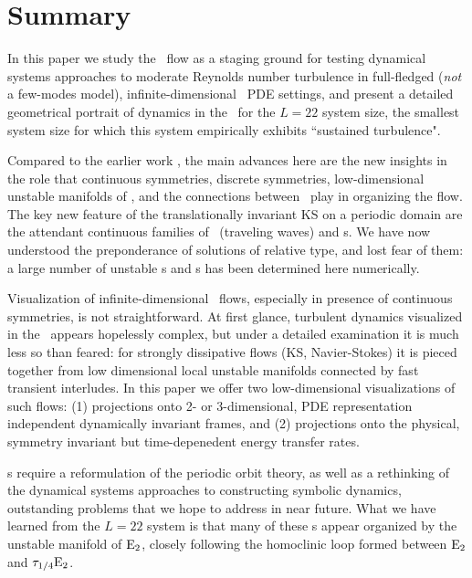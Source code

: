 
\section{Summary}
\label{sect:rpo-sum}

In this paper we study the \KS\ flow as a staging ground for
testing dynamical systems approaches to
moderate Reynolds number turbulence in full-fledged
({\em not} a few-modes model),
infinite-dimensional \statesp\ PDE settings,
and present a detailed geometrical portrait of dynamics in the
{\KS} \statesp\ for the $L=22$ system size, the smallest
system size for which this system empirically exhibits
``sustained turbulence".

Compared to the earlier work
,
the main advances here are the new insights in
the role that continuous symmetries,
discrete symmetries,
low-dimensional unstable manifolds of \eqva,
and the connections between \eqva\ play in organizing the flow.
The key new feature of the translationally invariant KS
on a periodic domain
are the attendant continuous families of
\reqva\ (traveling waves) and \rpo s.
We have now understood the preponderance of solutions of
relative type, and lost fear of them:
a large number of unstable \rpo s and \po s has been determined
here numerically.

Visualization of infinite-dimensional
\statesp\ flows, especially in presence of continuous symmetries,
is not straightforward.
At first glance, turbulent dynamics visualized in the \statesp\ appears
hopelessly complex, but under a detailed examination it is
much less so than feared: for strongly dissipative flows (KS, Navier-Stokes)
it is pieced together from low dimensional
local unstable manifolds connected by fast transient interludes.
In this paper we offer two low-dimensional visualizations of such
flows: (1) projections onto 2- or 3-dimensional,
PDE representation independent
dynamically invariant frames, and
(2) projections onto
the physical, symmetry invariant but time-depenedent
energy transfer rates.

\Rpo s require a reformulation of the
periodic orbit theory, as well as
a rethinking of the dynamical systems
approaches to constructing symbolic dynamics,
outstanding problems that we hope to address in near future.
What we have learned from the $L=22$ system  is that
many of these \rpo s appear
organized by the unstable manifold of $\mathrm{E}_{2}$, closely
following the homoclinic loop formed between
$\mathrm{E}_{2}$ and $\tau_{1/4}\mathrm{E}_{2}$.


